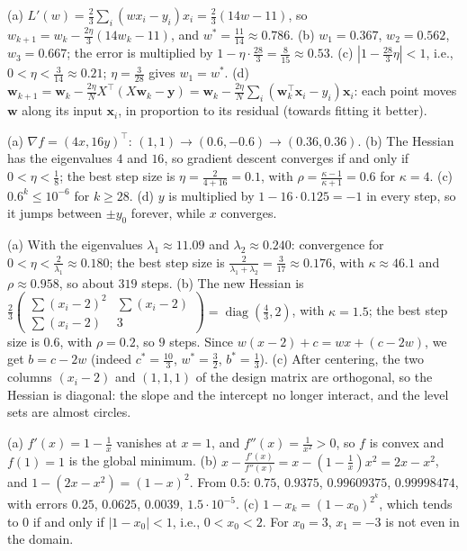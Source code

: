 \documentclass[11pt]{article}
\DeclareMathOperator{\diag}{diag}
\begin{document}
\begin{description}[leftmargin=0pt, itemsep=0.3em]
    \item[\ref{pr:gd-mse}.] (a) $L'(w) = \frac{2}{3}\sum_i (wx_i - y_i)x_i = \frac{2}{3}(14w - 11)$, so $w_{k+1} = w_k - \frac{2\eta}{3}(14w_k - 11)$, and $w^* = \frac{11}{14} \approx 0.786$. (b) $w_1 = 0.367$, $w_2 = 0.562$, $w_3 = 0.667$; the error is multiplied by $1 - \eta \cdot \frac{28}{3} = \frac{8}{15} \approx 0.53$. (c) $|1 - \frac{28}{3}\eta| < 1$, i.e., $0 < \eta < \frac{3}{14} \approx 0.21$; $\eta = \frac{3}{28}$ gives $w_1 = w^*$. (d) $\mathbf{w}_{k+1} = \mathbf{w}_k - \frac{2\eta}{N}X^\top(X\mathbf{w}_k - \mathbf{y}) = \mathbf{w}_k - \frac{2\eta}{N}\sum_i (\mathbf{w}_k^\top\mathbf{x}_i - y_i)\mathbf{x}_i$: each point moves $\mathbf{w}$ along its input $\mathbf{x}_i$, in proportion to its residual (towards fitting it better).
    \item[\ref{pr:gd-quadratic}.] (a) $\nabla f = (4x, 16y)^\top$: $(1, 1) \to (0.6, -0.6) \to (0.36, 0.36)$. (b) The Hessian has the eigenvalues $4$ and $16$, so gradient descent converges if and only if $0 < \eta < \frac{1}{8}$; the best step size is $\eta = \frac{2}{4 + 16} = 0.1$, with $\rho = \frac{\kappa - 1}{\kappa + 1} = 0.6$ for $\kappa = 4$. (c) $0.6^k \leq 10^{-6}$ for $k \geq 28$. (d) $y$ is multiplied by $1 - 16 \cdot 0.125 = -1$ in every step, so it jumps between $\pm y_0$ forever, while $x$ converges.
    \item[\ref{pr:gd-least-squares}.] (a) With the eigenvalues $\lambda_1 \approx 11.09$ and $\lambda_2 \approx 0.240$: convergence for $0 < \eta < \frac{2}{\lambda_1} \approx 0.180$; the best step size is $\frac{2}{\lambda_1 + \lambda_2} = \frac{3}{17} \approx 0.176$, with $\kappa \approx 46.1$ and $\rho \approx 0.958$, so about $319$ steps. (b) The new Hessian is $\frac{2}{3}\begin{pmatrix} \sum(x_i - 2)^2 & \sum(x_i - 2) \\ \sum(x_i - 2) & 3 \end{pmatrix} = \diag(\frac{4}{3}, 2)$, with $\kappa = 1.5$; the best step size is $0.6$, with $\rho = 0.2$, so $9$ steps. Since $w(x - 2) + c = wx + (c - 2w)$, we get $b = c - 2w$ (indeed $c^* = \frac{10}{3}$, $w^* = \frac{3}{2}$, $b^* = \frac{1}{3}$). (c) After centering, the two columns $(x_i - 2)$ and $(1, 1, 1)$ of the design matrix are orthogonal, so the Hessian is diagonal: the slope and the intercept no longer interact, and the level sets are almost circles.
    \item[\ref{pr:newton-log}.] (a) $f'(x) = 1 - \frac{1}{x}$ vanishes at $x = 1$, and $f''(x) = \frac{1}{x^2} > 0$, so $f$ is convex and $f(1) = 1$ is the global minimum. (b) $x - \frac{f'(x)}{f''(x)} = x - (1 - \frac{1}{x})x^2 = 2x - x^2$, and $1 - (2x - x^2) = (1 - x)^2$. From $0.5$: $0.75$, $0.9375$, $0.99609375$, $0.99998474$, with errors $0.25$, $0.0625$, $0.0039$, $1.5 \cdot 10^{-5}$. (c) $1 - x_k = (1 - x_0)^{2^k}$, which tends to $0$ if and only if $|1 - x_0| < 1$, i.e., $0 < x_0 < 2$. For $x_0 = 3$, $x_1 = -3$ is not even in the domain.

\end{description}
\end{document}
